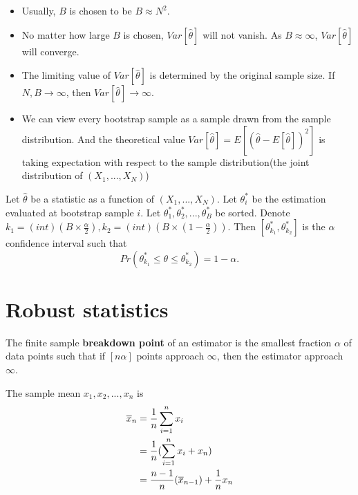 \begin{refsection}
\begin{remark}[interpretation]\hfill
	\begin{itemize}
		\item Usually, $B$ is chosen to be $B \approx N^2$. 
		\item No matter how large $B$ is chosen, $Var[\hat{\theta}]$ will not vanish. As $B\approx \infty$, $Var[\hat{\theta}]$ will converge.
		\item The limiting value of $Var[\hat{\theta}]$ is determined by the original sample size. If $N,B\to \infty$, then $Var[\hat{\theta}]\to \infty$.
		\item We can view every bootstrap sample as a sample drawn from the sample distribution. And the theoretical value $Var[\hat{\theta}] = E[(\hat{\theta} - E[\hat{\theta}])^2]$ is taking expectation with respect to the sample distribution(the joint distribution of $(X_1,...,X_N)$)
	\end{itemize}
\end{remark}

\begin{definition}
	Let $\hat{\theta}$ be a statistic as a function of $(X_1,...,X_N)$. Let $\theta^*_i$ be the estimation evaluated at bootstrap sample $i$. Let $\theta_1^*,\theta_2^*,...,\theta_B^*$ be sorted.
Denote $k_1 = (int)(B\times \frac{\alpha}{2}),k_2=(int)(B\times (1-\frac{\alpha}{2})).$	
Then $[\theta_{k_1}^*,\theta_{k_2}^*]$ is the $\alpha$ confidence interval such that
$$Pr(\theta_{k_1}^*\leq \theta\leq \theta_{k_2}^*) = 1-\alpha.$$
\end{definition}


\begin{definition}
\end{definition}



\section{Robust statistics}

\begin{definition}
The finite sample \textbf{breakdown point} of an estimator is the smallest fraction $\alpha$ of data points such that if $[n\alpha]$ points approach $\infty$, then the estimator approach $\infty$.	
\end{definition}

\begin{example}
The sample mean $x_1,x_2,...,x_n$ is
\begin{align*}
\overline{x}_n &= \frac{1}{n}\sum_{i=1}^{n} x_i \\
&=\frac{1}{n}(\sum_{i=1}^{n} x_i + x_n) \\
&=\frac{n-1}{n}(\overline{x}_{n-1}) + \frac{1}{n}x_n \\
\end{align*}	
\end{example}


\end{refsection}
